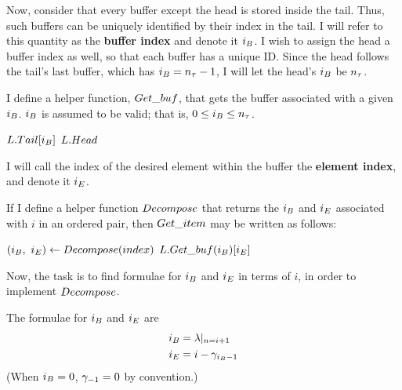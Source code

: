 Now, consider that every buffer except the head is stored inside the tail. Thus, such buffers can be uniquely identified by their index in the tail. I will refer to this quantity as the \textbf{buffer index} and denote it $i_B$. I wish to assign the head a buffer index as well, so that each buffer has a unique ID. Since the head follows the tail's last buffer, which has $i_B = n_\tau - 1$, I will let the head's $i_B$ be $n_\tau$.

I define a helper function, $\FuncGetBuffer$, that gets the buffer associated with a given $i_B$. $i_B$ is assumed to be valid; that is, $0 \leq i_B \leq n_\tau$.

\begin{algorithm}
	\begin{algorithmic}
		\Function{$\FuncGetBuffer$}{$\VarList,\ \LclIndexBuffer$}
				\State \Return $L.Tail[i_B]$
			\Else
				\State \Return $L.Head$
			\EndIf
		\EndFunction
	\end{algorithmic}
\end{algorithm}

I will call the index of the desired element within the buffer the \textbf{element index}, and denote it $i_E$.

If I define a helper function $Decompose$ that returns the $i_B$ and $i_E$ associated with $i$ in an ordered pair, then $\FuncGetItem$ may be written as follows:

\begin{algorithm}
	\begin{algorithmic}
		\Function{$\FuncGetItem$}{$\VarList,\ \ParamIndex$}
			\State $(i_B,\ i_E) \gets Decompose(index)$
			\State \Return $L.Get\_buf(i_B)[i_E]$
		\EndFunction
	\end{algorithmic}
\end{algorithm}

Now, the task is to find formulae for $i_B$ and $i_E$ in terms of $i$, in order to implement $Decompose$.

\begin{lemma}
	The formulae for $i_B$ and $i_E$ are
	\begin{align*}
	i_B &= \lambda|_{n = i + 1}\\
	i_E &= i - \gamma_{i_B - 1}
	\end{align*}
	(When $i_B = 0$, $\gamma_{-1} = 0$ by convention.)
\end{lemma}

